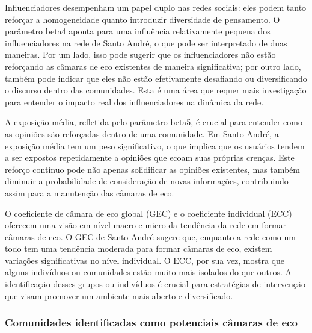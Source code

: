 Influenciadores desempenham um papel duplo nas redes sociais: eles podem tanto reforçar a homogeneidade quanto introduzir diversidade de pensamento. O parâmetro beta4 aponta para uma influência relativamente pequena dos influenciadores na rede de Santo André, o que pode ser interpretado de duas maneiras. Por um lado, isso pode sugerir que os influenciadores não estão reforçando as câmaras de eco existentes de maneira significativa; por outro lado, também pode indicar que eles não estão efetivamente desafiando ou diversificando o discurso dentro das comunidades. Esta é uma área que requer mais investigação para entender o impacto real dos influenciadores na dinâmica da rede.

A exposição média, refletida pelo parâmetro beta5, é crucial para entender como as opiniões são reforçadas dentro de uma comunidade. Em Santo André, a exposição média tem um peso significativo, o que implica que os usuários tendem a ser expostos repetidamente a opiniões que ecoam suas próprias crenças. Este reforço contínuo pode não apenas solidificar as opiniões existentes, mas também diminuir a probabilidade de consideração de novas informações, contribuindo assim para a manutenção das câmaras de eco.

O coeficiente de câmara de eco global (GEC) e o coeficiente individual (ECC) oferecem uma visão em nível macro e micro da tendência da rede em formar câmaras de eco. O GEC de Santo André sugere que, enquanto a rede como um todo tem uma tendência moderada para formar câmaras de eco, existem variações significativas no nível individual. O ECC, por sua vez, mostra que alguns indivíduos ou comunidades estão muito mais isolados do que outros. A identificação desses grupos ou indivíduos é crucial para estratégias de intervenção que visam promover um ambiente mais aberto e diversificado.

\subsubsection*{Comunidades identificadas como potenciais câmaras de eco}

